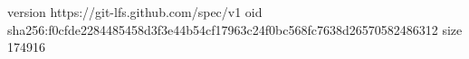 version https://git-lfs.github.com/spec/v1
oid sha256:f0cfde2284485458d3f3e44b54cf17963c24f0bc568fc7638d26570582486312
size 174916

